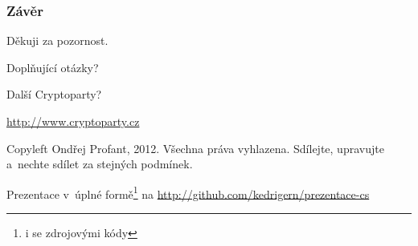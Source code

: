 \documentclass[xetex]{beamer}
\begin{document}
\begin{frame}
  \frametitle{Závěr}
	Děkuji za pozornost.

	\bigskip
	
	Doplňující otázky?

	\bigskip
	
	Další Cryptoparty?

	\bigskip

	\url{http://www.cryptoparty.cz}

	\bigskip

	\scriptsize
Copyleft Ondřej Profant, 2012. Všechna práva vyhlazena. Sdílejte, upravujte a~nechte sdílet za stejných podmínek. 

Prezentace v~úplné formě\footnote{i se zdrojovými kódy} na \url{http://github.com/kedrigern/prezentace-cs}
\end{frame}
\end{document}

